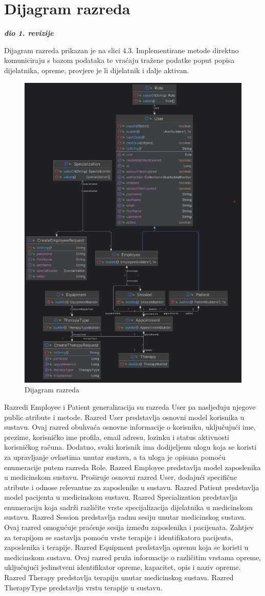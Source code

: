 			
		\section{Dijagram razreda}
		
		
            
            \textbf{\textit{dio 1. revizije}}
            
      

    Dijagram razreda  prikazan je  na slici 4.3.  Implementirane metode direktno komuniciraju s bazom podataka te vraćaju tražene podatke  poput popisa dijelatnika, opreme, provjere je li dijelatnik i dalje aktivan.
		   \begin{figure}[H]
    \centering
    \includegraphics[width=0.46\linewidth]{slike/dijagramRazreda.png}
    \caption{Dijagram razreda}
    \label{fig:enter-label}
\end{figure}
Razredi Employee i Patient  generalizacija su razreda User pa nasljeđuju njegove public atribute i metode.
Razred User predstavlja osnovni model korisnika u sustavu. Ovaj razred obuhvaća osnovne informacije o korisniku, uključujući ime, prezime, korisničko ime profila, email adresu, lozinku i status aktivnosti korisničkog računa. Dodatno, svaki korisnik ima dodijeljenu ulogu koja se koristi za upravljanje ovlastima unutar sustava, a ta uloga je opisana pomoću enumeracije putem razreda  Role.
Razred Employee predstavlja model zaposlenika u medicinskom sustavu. Proširuje osnovni razred User, dodajući specifične atribute i odnose relevantne za zaposlenike u sustavu.  Razred Patient predstavlja model pacijenta u medicinskom sustavu. 
Razred Specialization predstavlja enumeraciju koja sadrži različite vrste specijalizacija dijelatnika u medicinskom sustavu. 
Razred Session predstavlja radnu sesiju unutar medicinskog sustava. Ovaj razred omogućuje praćenje sesija između zaposlenika i pacijenata. 
 Zahtjev za terapijom se sastavlja pomoću  vrste terapije i identifikatora pacijenta, zaposlenika i terapije.
Razred Equipment predstavlja opremu koja se koristi u medicinskom sustavu. Ovaj razred pruža informacije o različitim vrstama opreme, uključujući jedinstveni identifikator opreme, kapacitet, opis i naziv opreme. 
Razred Therapy predstavlja terapiju unutar medicinskog sustava. 
Razred TherapyType predstavlja vrstu terapije u sustavu. \\



